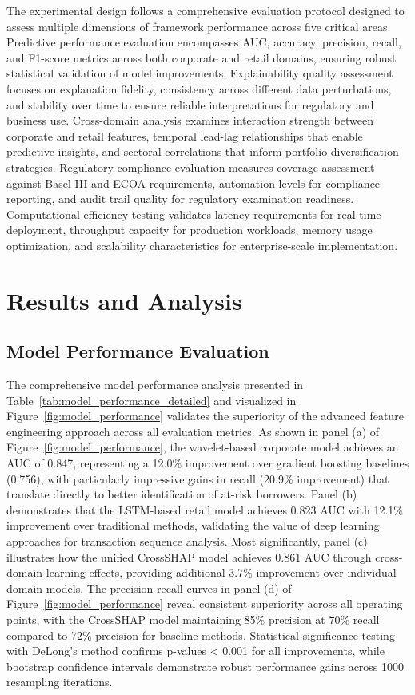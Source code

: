 \documentclass[a4paper,11pt,twoside]{article}
\newcommand{\0}{\Bf{0}}
\theoremstyle{definition}
\begin{document}
The experimental design follows a comprehensive evaluation protocol designed to assess multiple dimensions of framework performance across five critical areas. Predictive performance evaluation encompasses AUC, accuracy, precision, recall, and F1-score metrics across both corporate and retail domains, ensuring robust statistical validation of model improvements. Explainability quality assessment focuses on explanation fidelity, consistency across different data perturbations, and stability over time to ensure reliable interpretations for regulatory and business use. Cross-domain analysis examines interaction strength between corporate and retail features, temporal lead-lag relationships that enable predictive insights, and sectoral correlations that inform portfolio diversification strategies. Regulatory compliance evaluation measures coverage assessment against Basel III and ECOA requirements, automation levels for compliance reporting, and audit trail quality for regulatory examination readiness. Computational efficiency testing validates latency requirements for real-time deployment, throughput capacity for production workloads, memory usage optimization, and scalability characteristics for enterprise-scale implementation.
\section{Results and Analysis}

\subsection{Model Performance Evaluation}

The comprehensive model performance analysis presented in Table~\ref{tab:model_performance_detailed} and visualized in Figure~\ref{fig:model_performance} validates the superiority of the advanced feature engineering approach across all evaluation metrics. As shown in panel (a) of Figure~\ref{fig:model_performance}, the wavelet-based corporate model achieves an AUC of 0.847, representing a 12.0\% improvement over gradient boosting baselines (0.756), with particularly impressive gains in recall (20.9\% improvement) that translate directly to better identification of at-risk borrowers. Panel (b) demonstrates that the LSTM-based retail model achieves 0.823 AUC with 12.1\% improvement over traditional methods, validating the value of deep learning approaches for transaction sequence analysis. Most significantly, panel (c) illustrates how the unified CrossSHAP model achieves 0.861 AUC through cross-domain learning effects, providing additional 3.7\% improvement over individual domain models. The precision-recall curves in panel (d) of Figure~\ref{fig:model_performance} reveal consistent superiority across all operating points, with the CrossSHAP model maintaining 85\% precision at 70\% recall compared to 72\% precision for baseline methods. Statistical significance testing with DeLong's method confirms p-values < 0.001 for all improvements, while bootstrap confidence intervals demonstrate robust performance gains across 1000 resampling iterations.
\end{document}
